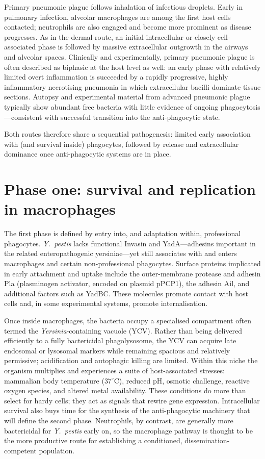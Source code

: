 \documentclass[11pt,a4paper]{article}
\begin{document}
Primary pneumonic plague follows inhalation of infectious droplets. Early in pulmonary infection, alveolar macrophages are among the first host cells contacted; neutrophils are also engaged and become more prominent as disease progresses. As in the dermal route, an initial intracellular or closely cell-associated phase is followed by massive extracellular outgrowth in the airways and alveolar spaces. Clinically and experimentally, primary pneumonic plague is often described as biphasic at the host level as well: an early phase with relatively limited overt inflammation is succeeded by a rapidly progressive, highly inflammatory necrotising pneumonia in which extracellular bacilli dominate tissue sections. Autopsy and experimental material from advanced pneumonic plague typically show abundant free bacteria with little evidence of ongoing phagocytosis---consistent with successful transition into the anti-phagocytic state.

Both routes therefore share a sequential pathogenesis: limited early association with (and survival inside) phagocytes, followed by release and extracellular dominance once anti-phagocytic systems are in place.

\section{Phase one: survival and replication in macrophages}

The first phase is defined by entry into, and adaptation within, professional phagocytes. \textit{Y.\ pestis} lacks functional Invasin and YadA---adhesins important in the related enteropathogenic yersiniae---yet still associates with and enters macrophages and certain non-professional phagocytes. Surface proteins implicated in early attachment and uptake include the outer-membrane protease and adhesin Pla (plasminogen activator, encoded on plasmid pPCP1), the adhesin Ail, and additional factors such as YadBC. These molecules promote contact with host cells and, in some experimental systems, promote internalisation.

Once inside macrophages, the bacteria occupy a specialised compartment often termed the \textit{Yersinia}-containing vacuole (YCV). Rather than being delivered efficiently to a fully bactericidal phagolysosome, the YCV can acquire late endosomal or lysosomal markers while remaining spacious and relatively permissive; acidification and autophagic killing are limited. Within this niche the organism multiplies and experiences a suite of host-associated stresses: mammalian body temperature ($37^\circ\mathrm{C}$), reduced pH, osmotic challenge, reactive oxygen species, and altered metal availability. These conditions do more than select for hardy cells; they act as signals that rewire gene expression. Intracellular survival also buys time for the synthesis of the anti-phagocytic machinery that will define the second phase. Neutrophils, by contrast, are generally more bactericidal for \textit{Y.\ pestis} early on, so the macrophage pathway is thought to be the more productive route for establishing a conditioned, dissemination-competent population.
\end{document}
